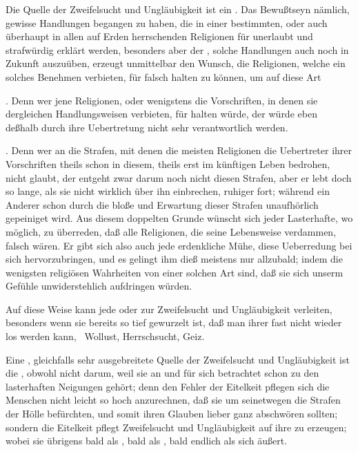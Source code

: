 \begin{aufza} 
\item Die  Quelle der Zweifelsucht und Ungläubigkeit ist ein . Das Bewußtseyn nämlich, gewisse Handlungen begangen zu haben, die in einer bestimmten, oder auch überhaupt in allen auf Erden herrschenden Religionen für unerlaubt und strafwürdig erklärt werden, besonders aber der , solche Handlungen auch noch in Zukunft auszuüben, erzeugt unmittelbar den Wunsch, die Religionen, welche ein solches Benehmen verbieten, für falsch halten zu können, um auf diese Art
\begin{aufzb}
\item {}. Denn wer jene Religionen, oder wenigstens die Vorschriften, in denen sie dergleichen Handlungsweisen verbieten, für  halten würde, der würde eben deßhalb durch ihre Uebertretung nicht sehr verantwortlich werden.
\item {}. Denn wer an die Strafen, mit denen die meisten Religionen die Uebertreter ihrer Vorschriften theils schon in diesem, theils erst im künftigen Leben bedrohen, nicht glaubt, der entgeht zwar darum noch nicht diesen Strafen, aber er lebt doch so lange, als sie nicht wirklich über ihn einbrechen, ruhiger fort; während ein Anderer schon durch die bloße  und Erwartung dieser Strafen unaufhörlich gepeiniget wird. Aus diesem doppelten Grunde wünscht sich jeder Lasterhafte, wo möglich, zu überreden, daß alle Religionen, die seine Lebensweise verdammen, falsch wären. Er gibt sich also auch jede erdenkliche Mühe, diese Ueberredung bei sich hervorzubringen, und es gelingt ihm dieß meistens nur allzubald; indem die wenigsten religiösen Wahrheiten von einer solchen Art sind, daß sie sich unserm Gefühle unwiderstehlich aufdringen würden.
\end{aufzb}
\begin{RWanm}
Auf diese Weise kann jede  oder  zur Zweifelsucht und Ungläubigkeit verleiten, besonders wenn sie bereits so tief gewurzelt ist, daß man ihrer fast nicht wieder los werden kann, \zB\ Wollust, Herrschsucht, Geiz.
\end{RWanm}
\item Eine , gleichfalls sehr ausgebreitete Quelle der Zweifelsucht und Ungläubigkeit ist die , obwohl nicht darum, weil sie an und für sich betrachtet schon zu den lasterhaften Neigungen gehört; denn den Fehler der Eitelkeit pflegen sich die Menschen nicht leicht so hoch anzurechnen, daß sie um seinetwegen die Strafen der Hölle befürchten, und somit ihren Glauben lieber ganz abschwören sollten; sondern die Eitelkeit pflegt Zweifelsucht und Ungläubigkeit auf ihre  zu erzeugen; wobei sie übrigens bald als , bald als , bald endlich als  sich äußert.

\end{aufza}
